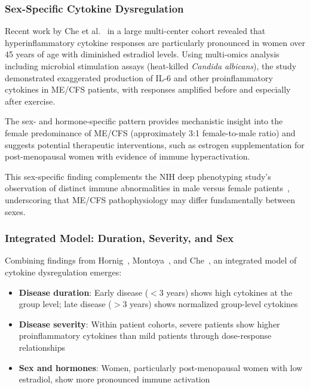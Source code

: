 \subsubsection{Sex-Specific Cytokine Dysregulation}

\begin{observation}
\label{obs:sex-cytokines}
Recent work by Che et al.~\cite{Che2025} in a large multi-center cohort revealed that hyperinflammatory cytokine responses are particularly pronounced in women over 45 years of age with diminished estradiol levels. Using multi-omics analysis including microbial stimulation assays (heat-killed \emph{Candida albicans}), the study demonstrated exaggerated production of IL-6 and other proinflammatory cytokines in ME/CFS patients, with responses amplified before and especially after exercise.

The sex- and hormone-specific pattern provides mechanistic insight into the female predominance of ME/CFS (approximately 3:1 female-to-male ratio) and suggests potential therapeutic interventions, such as estrogen supplementation for post-menopausal women with evidence of immune hyperactivation.
\end{observation}

This sex-specific finding complements the NIH deep phenotyping study's observation of distinct immune abnormalities in male versus female patients~\cite{walitt2024deep}, underscoring that ME/CFS pathophysiology may differ fundamentally between sexes.

\subsubsection{Integrated Model: Duration, Severity, and Sex}

Combining findings from Hornig~\cite{Hornig2015}, Montoya~\cite{Montoya2017}, and Che~\cite{Che2025}, an integrated model of cytokine dysregulation emerges:

\begin{itemize}
    \item \textbf{Disease duration}: Early disease ($<$3 years) shows high cytokines at the group level; late disease ($>$3 years) shows normalized group-level cytokines
    \item \textbf{Disease severity}: Within patient cohorts, severe patients show higher proinflammatory cytokines than mild patients through dose-response relationships
    \item \textbf{Sex and hormones}: Women, particularly post-menopausal women with low estradiol, show more pronounced immune activation
\end{itemize}

